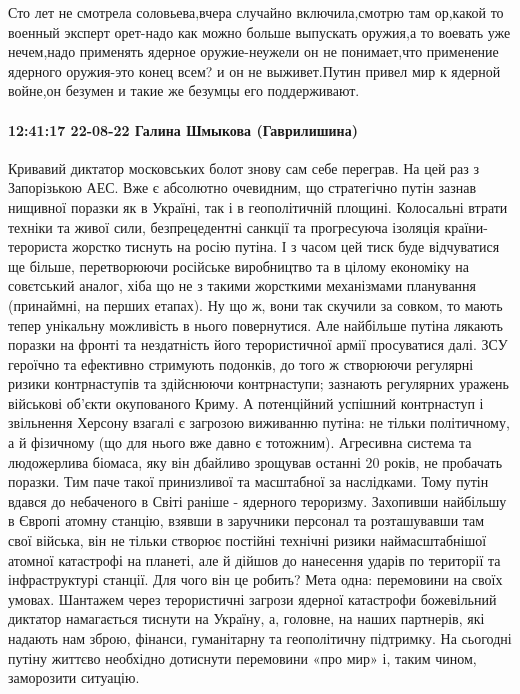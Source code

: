 Сто лет не смотрела соловьева,вчера случайно включила,смотрю там ор,какой то
военный эксперт орет-надо как можно больше выпускать оружия,а то воевать уже
нечем,надо применять ядерное оружие-неужели он не понимает,что применение
ядерного оружия-это конец всем? и он не выживет.Путин привел мир к ядерной
войне,он безумен и такие же безумцы его поддерживают.

\paragraph{12:41:17 22-08-22 Галина Шмыкова (Гаврилишина)}

Кривавий диктатор московських болот знову сам себе переграв.
На цей раз з Запорізькою АЕС.
Вже є абсолютно очевидним, що стратегічно путін зазнав нищивної поразки як в Україні, так і в геополітичній площині.
Колосальні втрати техніки та живої сили, безпрецедентні санкції та прогресуюча ізоляція країни-терориста жорстко тиснуть на росію путіна.
І з часом цей тиск буде відчуватися ще більше, перетворюючи російське виробництво та в цілому економіку на совєтський аналог, хіба що не з такими жорсткими механізмами планування (принаймні, на перших етапах). Ну що ж, вони так скучили за совком, то мають тепер унікальну можливість в нього повернутися.
Але найбільше путіна лякають поразки на фронті та нездатність його терористичної армії просуватися далі.
ЗСУ героїчно та ефективно стримують подонків, до того ж створюючи регулярні ризики контрнаступів та здійснюючи контрнаступи; зазнають регулярних уражень військові об’єкти окупованого Криму.
А потенційний успішний контрнаступ і звільнення Херсону взагалі є загрозою виживанню путіна: не тільки політичному, а й фізичному (що для нього вже давно є тотожним). Агресивна система та людожерлива біомаса, яку він дбайливо зрощував останні 20 років, не пробачать поразки. Тим паче такої принизливої та масштабної за наслідками.
Тому путін вдався до небаченого в Світі раніше - ядерного тероризму. Захопивши найбільшу в Європі атомну станцію, взявши в заручники персонал та розташувавши там свої війська, він не тільки створює постійні технічні ризики наймасштабнішої атомної катастрофі на планеті, але й дійшов до нанесення ударів по території та інфраструктурі станції.
Для чого він це робить?
Мета одна: перемовини на своїх умовах.
Шантажем через терористичні загрози ядерної катастрофи божевільний диктатор намагається тиснути на Україну, а, головне, на наших партнерів, які надають нам зброю, фінанси, гуманітарну та геополітичну підтримку.
На сьогодні путіну життєво необхідно дотиснути перемовини «про мир» і, таким чином, заморозити ситуацію.
